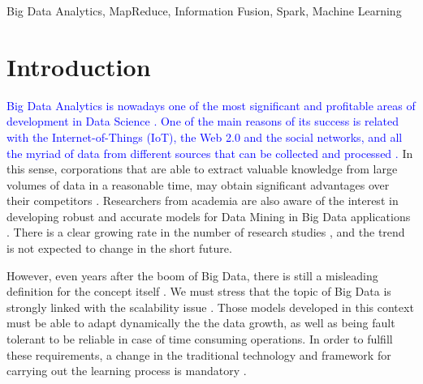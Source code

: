 \documentclass[3p,review]{elsarticle}
\begin{document}
\begin{frontmatter}
\begin{abstract}
			
		\end{abstract}
		
		\begin{keyword}
			Big Data Analytics, MapReduce, Information Fusion, Spark, Machine Learning
		\end{keyword}
		
	\end{frontmatter}
	
	\section{Introduction}\label{sec:intro}
	
	
	
	\textcolor{blue}{Big Data Analytics is nowadays one of the most significant and profitable areas of development in Data Science \cite{Chen12-BI-BD, Min13-BDAnalBook, Fer14,Chen14, Chen17-Book, davis17}. One of the main reasons of its success is related with the Internet-of-Things (IoT), the Web 2.0 and the social networks, and all the myriad of data from different sources that can be collected and processed \cite{davis17,Fuqaha15-IoT,OrgazJC16}.} In this sense, corporations that are able to extract valuable knowledge from large volumes of data in a reasonable time, may obtain significant advantages over their competitors \cite{Lar16-BI,Choi17-BDAnal}. Researchers from academia are also aware of the interest in developing robust and accurate models for Data Mining in Big Data applications \cite{wu14, Wix14-BDAcad}. There is a clear growing rate in the number of research studies \cite{Abb16-BDIS,Chen16}, and the trend is not expected to change in the short future.
	
	However, even years after the boom of Big Data, there is still a misleading definition for the concept itself \cite{Gan15-BDhype}. We must stress that the topic of Big Data is strongly linked with the scalability issue \cite{Hu14-ScalBDAnal}. Those models developed in this context must be able to adapt dynamically the the data growth, as well as being fault tolerant to be reliable in case of time consuming operations. In order to fulfill these requirements, a change in the traditional technology and framework for carrying out the learning process is mandatory \cite{ChenMZL14}. 
	
\end{document}

